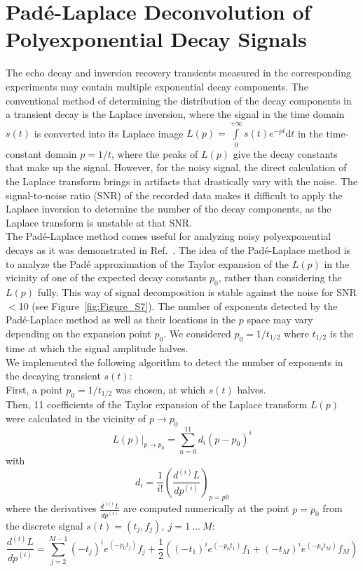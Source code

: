 \section{Pad{\'e}-Laplace Deconvolution of Polyexponential Decay Signals}
\label{sec:pade-laplace}
The echo decay and inversion recovery transients measured in the corresponding experiments may contain multiple exponential decay components. The conventional method of determining the distribution of the decay components in a transient decay is the Laplace inversion, where the signal in the time domain $s(t)$ is converted into its Laplace image $L(p)=\int\limits_{0}^{+\infty}s(t)e^{-pt}\mathrm{d}t$ in the time-constant domain $p=1/t$, where the peaks of $L(p)$ give the decay constants that make up the signal. However, for the noisy signal, the direct calculation of the Laplace transform brings in artifacts that drastically vary with the noise. The signal-to-noise ratio (SNR) of the recorded data makes it difficult to apply the Laplace inversion to determine the number of the decay components, as the Laplace transform is unstable at that SNR. \\ 


The Pad{\'e}-Laplace method comes useful for analyzing noisy polyexponential decays as it was demonstrated in Ref.~\cite{Hellen_2005}. The idea of the Pad{\'e}-Laplace method is to analyze the Pad{\'e} approximation of the Taylor expansion of the $L(p)$ in the vicinity of one of the expected decay constants $p_0$, rather than considering the $L(p)$ fully. This way of signal decomposition is stable against the noise for SNR$<$10 (see Figure~\ref{fig:Figure_S7}). The number of exponents detected by the Pad{\'e}-Laplace method as well as their locations in the $p$ space may vary depending on the expansion point $p_0$. We considered $p_0=1/t_{1/2}$ where $t_{1/2}$ is the time at which the signal amplitude halves.\\

We implemented the following algorithm to detect the number of exponents in the decaying transient $s(t)$:\\

First, a point $p_0=1/t_{1/2}$ was chosen, at which $s(t)$ halves.\\

Then, 11 coefficients of the Taylor expansion of the Laplace transform $L(p)$ were calculated in the vicinity of $p \rightarrow p_0$\\

\begin{equation}
L(p)\vert_{p \rightarrow p_0} = \sum_{n=0}^{11} d_i (p-p_0)^i
\end{equation}
with
\begin{equation}
d_i = \frac{1}{i!}\left(\frac{d^{(i)}L}{dp^{(i)}}\right)_{p=p0}
\end{equation}
where the derivatives $\frac{d^{(i)}L}{dp^{(i)}}$ are computed numerically at the point $p=p_{0}$ from the discrete signal $s(t) = (t_j,f_j),~j=1~...~M$:
\begin{equation}
\frac{d^{(i)}L}{dp^{(i)}}= \sum_{j=2}^{M-1}(-t_j)^ie^{(-p_0t_j)}f_j + \frac{1}{2}\left((-t_1)^ie^{(-p_0t_1)}f_1+(-t_M)^ie^{(-p_0t_M)}f_M \right)
\end{equation}



